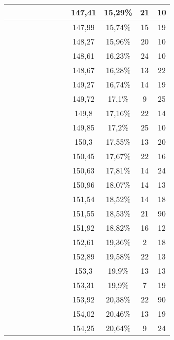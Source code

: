 \begin{center}
\begin{longtable}{|c|c|c|c|c|c|c|c|c|c|c|c|}
 \x &  &  &  \x &  &  &  &  & 147,41 & 15,29\% & 21 & 10  \\ \hline
 \x &  \x &  &  \x &  \x &  \x &  \x &  \x & 147,99 & 15,74\% & 15 & 19  \\ \hline
 \x &  \x &  \x &  \x &  &  \x &  \x &  & 148,27 & 15,96\% & 20 & 10  \\ \hline
 \x &  &  \x &  \x &  \x &  \x &  &  & 148,61 & 16,23\% & 24 & 10  \\ \hline
 \x &  &  &  \x &  \x &  &  &  \x & 148,67 & 16,28\% & 13 & 22  \\ \hline
 \x &  &  &  \x &  &  &  &  \x & 149,27 & 16,74\% & 14 & 19  \\ \hline
 \x &  &  &  &  &  &  &  & 149,72 & 17,1\% & 9 & 25  \\ \hline
 \x &  &  \x &  &  &  &  \x &  & 149,8 & 17,16\% & 22 & 14  \\ \hline
 \x &  \x &  \x &  \x &  &  \x &  &  & 149,85 & 17,2\% & 25 & 10  \\ \hline
 \x &  &  &  &  &  \x &  \x &  \x & 150,3 & 17,55\% & 13 & 20  \\ \hline
 \x &  \x &  \x &  \x &  &  &  \x &  & 150,45 & 17,67\% & 22 & 16  \\ \hline
 \x &  &  \x &  \x &  \x &  &  &  & 150,63 & 17,81\% & 14 & 24  \\ \hline
 \x &  &  \x &  \x &  &  \x &  &  & 150,96 & 18,07\% & 14 & 13  \\ \hline
 \x &  &  \x &  &  \x &  \x &  &  & 151,54 & 18,52\% & 14 & 18  \\ \hline
 \x &  &  &  &  \x &  \x &  &  \x & 151,55 & 18,53\% & 21 & 90  \\ \hline
 \x &  &  \x &  &  &  \x &  \x &  \x & 151,92 & 18,82\% & 16 & 12  \\ \hline
 \x &  \x &  &  &  \x &  \x &  \x &  & 152,61 & 19,36\% & 2 & 18  \\ \hline
 \x &  \x &  \x &  &  \x &  &  \x &  & 152,89 & 19,58\% & 22 & 13  \\ \hline
 \x &  \x &  &  &  &  &  \x &  & 153,3 & 19,9\% & 13 & 13  \\ \hline
 \x &  \x &  &  &  \x &  &  \x &  & 153,31 & 19,9\% & 7 & 19  \\ \hline
 \x &  &  &  &  &  &  \x &  & 153,92 & 20,38\% & 22 & 90  \\ \hline
 \x &  &  \x &  \x &  &  &  &  & 154,02 & 20,46\% & 13 & 19  \\ \hline
 \x &  \x &  \x &  \x &  \x &  &  &  \x & 154,25 & 20,64\% & 9 & 24  \\ \hline

\end{longtable}
\end{center}
